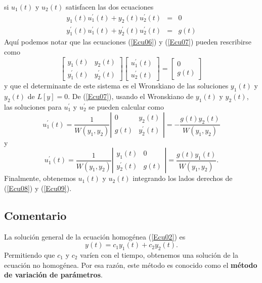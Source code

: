 \documentclass[12pt]{article}
\def\DotPro#1#2#3#4{
#1#2+#3#4
}
\def\LasUs{
u_{1}(t)\mbox{\ y\ }u_{2}(t) 
}
\def\LasYs{
y_{1}(t)\mbox{\ y\ }y_{2}(t)
}
\begin{document}
si $\LasUs$ satisfacen las dos ecuaciones
\begin{eqnarray}
\DotPro{y_{1}(t)}{u_{1}^{\prime}(t)}{y_{2}(t)}{u_{2}^{\prime}(t)}&=&0\label{Ecu06}\\
\DotPro{y_{1}^{\prime}(t)}{u_{1}^{\prime}(t)}{y_{2}^{\prime}(t)}{u_{2}^{\prime}(t)}&=&g(t)\label{Ecu07}
\end{eqnarray}
Aquí podemos notar que las ecuaciones (\ref{Ecu06}) y (\ref{Ecu07}) pueden rescribirse como
\begin{equation}\left[
\begin{array}{cc}
y_{1}(t) & y_{2}(t)\\
y_{1}^{\prime}(t) & y_{2}^{\prime}(t)
\end{array}\right]\left[\begin{array}{c}
u_{1}^{\prime}(t)\\
u_{2}^{\prime}(t)
\end{array}\right]=\left[\begin{array}{c}
0\\
g(t)
\end{array}\right]
\label{Ecu07}
\end{equation}
y que el determinante de este sistema es el Wronskiano de las soluciones $y_{1}(t)$ y $y_{2}(t)$ de 
$L[y]=0$. De (\ref{Ecu07}), usando el Wronskiano de $\LasYs$, las soluciones para $u_{1}^{\prime}$ y 
$u_{2}^{\prime}$ se pueden calcular como
\begin{equation}
u_{1}^{\prime}(t)=\frac{1}{W(y_{1},y_{2})}\left|\begin{array}{cc}
0    & y_{2}(t)\\
g(t) & y_{2}^{\prime}(t)
\end{array}\right|=-\frac{g(t)y_{2}(t)}{W(y_{1},y_{2})}
\label{Ecu08}
\end{equation}
y
\begin{equation}
u_{1}^{\prime}(t)=\frac{1}{W(y_{1},y_{2})}\left|\begin{array}{cc}
y_{1}(t)         & 0\\
y_{2}^{\prime}(t)& g(t) 
\end{array}\right|=\frac{g(t)y_{1}(t)}{W(y_{1},y_{2})}.
\label{Ecu09}
\end{equation}
Finalmente, obtenemos $u_{1}(t)$ y $u_{2}(t)$ integrando los lados derechos de (\ref{Ecu08}) y 
(\ref{Ecu09}).
\subsection{Comentario}
La solución general de la ecuación homogénea (\ref{Ecu02}) es
\begin{equation}
y(t)=\DotPro{c_{1}}{y_{1}(t)}{c_{2}}{y_{2}(t)}.
\label{Ecu10}
\end{equation}
Permitiendo que $c_{1}$ y $c_{2}$ varíen con el tiempo, obtenemos una solución de la ecuación 
no homogénea. Por esa razón, este método es conocido como el {\bf método de variación de parámetros}. 
\end{document}
